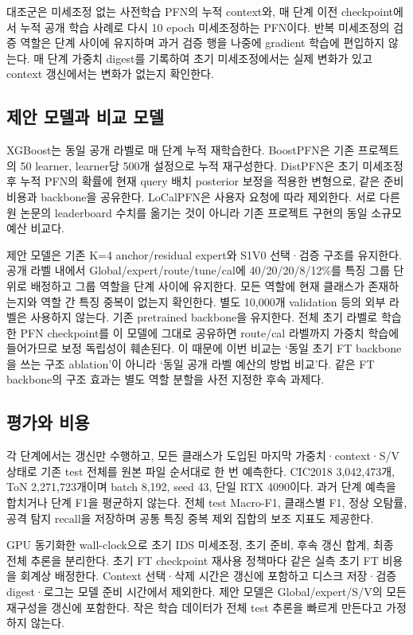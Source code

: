대조군은 미세조정 없는 사전학습 PFN의 누적 context와, 매 단계 이전 checkpoint에서 누적 공개 학습 사례로 다시 10 epoch 미세조정하는 PFN이다. 반복 미세조정의 검증 역할은 단계 사이에 유지하며 과거 검증 행을 나중에 gradient 학습에 편입하지 않는다. 매 단계 가중치 digest를 기록하여 초기 미세조정에서는 실제 변화가 있고 context 갱신에서는 변화가 없는지 확인한다.

\subsection{제안 모델과 비교 모델}
XGBoost는 동일 공개 라벨로 매 단계 누적 재학습한다. BoostPFN은 기존 프로젝트의 50 learner, learner당 500개 설정으로 누적 재구성한다. DistPFN은 초기 미세조정 후 누적 PFN의 확률에 현재 query 배치 posterior 보정을 적용한 변형으로, 같은 준비 비용과 backbone을 공유한다. LoCalPFN은 사용자 요청에 따라 제외한다. 서로 다른 원 논문의 leaderboard 수치를 옮기는 것이 아니라 기존 프로젝트 구현의 동일 소규모 예산 비교다.

제안 모델은 기존 K=\allowbreak{}4 anchor/\allowbreak{}residual expert와 S1V0 선택·검증 구조를 유지한다. 공개 라벨 내에서 Global/\allowbreak{}expert/\allowbreak{}route/\allowbreak{}tune/\allowbreak{}cal에 40/\allowbreak{}20/\allowbreak{}20/\allowbreak{}8/\allowbreak{}12\%를 특징 그룹 단위로 배정하고 그룹 역할을 단계 사이에 유지한다. 모든 역할에 현재 클래스가 존재하는지와 역할 간 특징 중복이 없는지 확인한다. 별도 10,000개 validation 등의 외부 라벨은 사용하지 않는다. 기존 pretrained backbone을 유지한다. 전체 초기 라벨로 학습한 PFN checkpoint를 이 모델에 그대로 공유하면 route/\allowbreak{}cal 라벨까지 가중치 학습에 들어가므로 보정 독립성이 훼손된다. 이 때문에 이번 비교는 ‘동일 초기 FT backbone을 쓰는 구조 ablation’이 아니라 ‘동일 공개 라벨 예산의 방법 비교’다. 같은 FT backbone의 구조 효과는 별도 역할 분할을 사전 지정한 후속 과제다.

\subsection{평가와 비용}
각 단계에서는 갱신만 수행하고, 모든 클래스가 도입된 마지막 가중치·context·S/\allowbreak{}V 상태로 기존 test 전체를 원본 파일 순서대로 한 번 예측한다. CIC2018 3,042,473개, ToN 2,271,723개이며 batch 8,192, seed 43, 단일 RTX 4090이다. 과거 단계 예측을 합치거나 단계 F1을 평균하지 않는다. 전체 test Macro-F1, 클래스별 F1, 정상 오탐률, 공격 탐지 recall을 저장하며 공통 특징 중복 제외 집합의 보조 지표도 제공한다.

GPU 동기화한 wall-clock으로 초기 IDS 미세조정, 초기 준비, 후속 갱신 합계, 최종 전체 추론을 분리한다. 초기 FT checkpoint 재사용 정책마다 같은 실측 초기 FT 비용을 회계상 배정한다. Context 선택·삭제 시간은 갱신에 포함하고 디스크 저장·검증 digest·로그는 모델 준비 시간에서 제외한다. 제안 모델은 Global/\allowbreak{}expert/\allowbreak{}S/\allowbreak{}V의 모든 재구성을 갱신에 포함한다. 작은 학습 데이터가 전체 test 추론을 빠르게 만든다고 가정하지 않는다.

